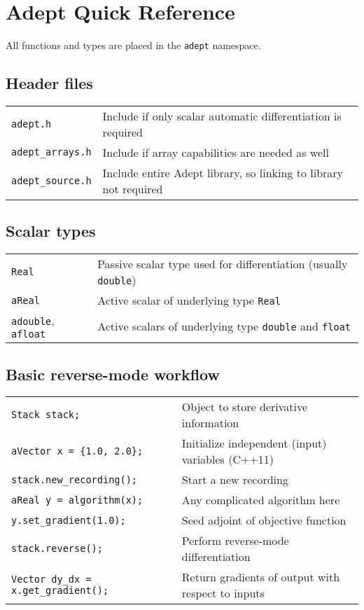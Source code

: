 \documentclass[10pt,a4,landscape]{article}
\def\myfont{\fontfamily{cmss}\selectfont}
\def\mysize{\footnotesize}
\def\mysize{\small}
\def\code#1{\texttt{#1}}
\begin{document}
\pagestyle{empty}
\twocolumn
\mysize\myfont\section*{\Huge Adept Quick Reference}
All functions and types are placed in the \code{adept} namespace.
\subsection*{Header files}
\begin{tabular}{ll}
\code{adept.h} & Include if only scalar automatic differentiation is required\\
\code{adept\_arrays.h} & Include if array capabilities are needed as well\\
\code{adept\_source.h} & Include entire Adept library, so linking to library not required \\
\end{tabular}

\subsection*{Scalar types}
\begin{tabular}{ll}
\code{Real} & Passive scalar type used for differentiation (usually
\code{double})\\
\code{aReal} & Active scalar of underlying type \code{Real} \\
\code{adouble}, \code{afloat} & Active scalars of underlying type
\code{double} and \code{float}\\
\end{tabular}
\subsection*{Basic reverse-mode workflow}
\begin{tabular}{ll}
\code{Stack stack;} & Object to store derivative information\\
\code{aVector x = \{1.0, 2.0\};} & Initialize independent (input) variables (C++11)\\
\code{stack.new\_recording();} & Start a new recording\\
\code{aReal y = algorithm(x);} & Any complicated algorithm here\\
\code{y.set\_gradient(1.0);} & Seed adjoint of objective function\\
\code{stack.reverse();} & Perform reverse-mode differentiation\\
\code{Vector dy\_dx = x.get\_gradient();} & Return gradients of output with respect to inputs\\
\end{tabular}
\end{document}
